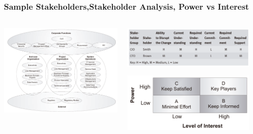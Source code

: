 \documentclass[aspectratio=169, table]{beamer}
\begin{document}
	{
		\begin{frame}
			\frametitle{Sample Stakeholders,Stakeholder Analysis, Power vs Interest}
			\framesubtitle{\hspace{1cm}}
			\begin{columns}
				\begin{column}{0.5\textwidth}
					\begin{center}
						\includegraphics[width=\textwidth]{../figures/sample_stakeholders}
					\end{center}
				\end{column}
				\begin{column}{0.5\textwidth}
					\begin{center}
						\includegraphics[width=\textwidth]{../figures/stakeholder_analysis}
					\end{center}
					\begin{center}
						\includegraphics[width=\textwidth]{../figures/power_vs_interest}
					\end{center}
				\end{column}
			\end{columns}
			
		\end{frame}
	}
	
\end{document}
